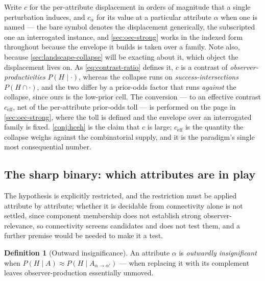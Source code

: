 \documentclass[11pt]{article}
\theoremstyle{definition}
\newtheorem{definition}{Definition}
\begin{document}
Write $c$ for the per-attribute displacement in orders of magnitude that a single perturbation induces, and $c_\alpha$ for its value at a particular attribute $\alpha$ when one is named --- the bare symbol denotes the displacement generically, the subscripted one an interrogated instance, and \autoref{sec:oec-strong} works in the indexed form throughout because the envelope it builds is taken over a family. Note also, because \autoref{sec:landscape-collapse} will be exacting about it, which object the displacement lives on. As \eqref{eq:contrast-ratio} defines it, $c$ is a contrast of \emph{observer-productivities} $P(H \mid \cdot)$, whereas the collapse runs on \emph{success-intersections} $P(H \cap \cdot)$, and the two differ by a prior-odds factor that runs \emph{against} the collapse, since ours is the low-prior cell. The conversion --- to an effective contrast $c_{\mathrm{eff}}$, net of the per-attribute prior-odds toll --- is performed on the page in \autoref{sec:oec-strong}, where the toll is defined and the envelope over an interrogated family is fixed. \autoref{conj:hceh} is the claim that $c$ is large; $c_{\mathrm{eff}}$ is the quantity the collapse weighs against the combinatorial supply, and it is the paradigm's single most consequential number.

\subsection{The sharp binary: which attributes are in play}
\label{sec:contrast-binary}

The hypothesis is explicitly restricted, and the restriction must be applied attribute by attribute; whether it is decidable from connectivity alone is not settled, since component membership does not establish strong observer-relevance, so connectivity screens candidates and does not test them, and a further premise would be needed to make it a test.

\begin{definition}[Outward insignificance]
\label{def:outward}
An attribute $\alpha$ is \emph{outwardly insignificant} when $P(H \mid A) \approx P(H \mid A_{\alpha \to \alpha'})$ --- when replacing it with its complement leaves observer-production essentially unmoved.
\end{definition}
\end{document}
